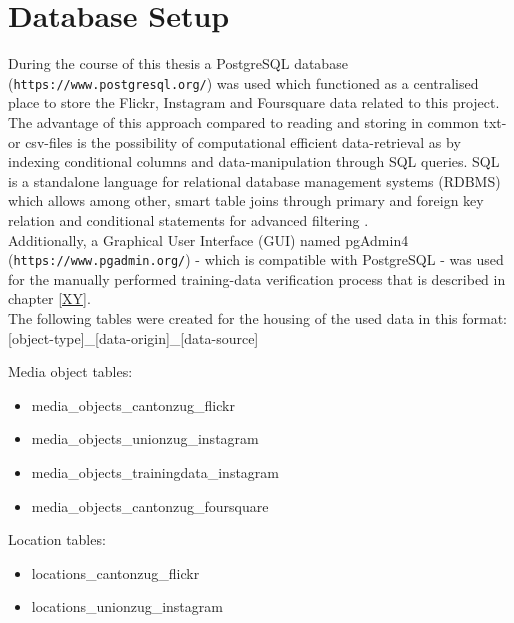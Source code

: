 \section{Database Setup} \label{database_setup}
During the course of this thesis a PostgreSQL database (\texttt{https://www.postgresql.org/}) was used which functioned as a centralised place to store the Flickr, Instagram and Foursquare data related to this project. The advantage of this approach compared to reading and storing in common txt- or csv-files is the possibility of computational efficient data-retrieval as by indexing conditional columns and data-manipulation through SQL queries. SQL is a standalone language for relational database management systems (RDBMS) which allows among other, smart table joins through primary and foreign key relation and conditional statements for advanced filtering \parencite{PostgreSQL2019}.\\
Additionally, a Graphical User Interface (GUI) named pgAdmin4 (\texttt{https://www.pgadmin.org/}) - which is compatible with PostgreSQL - was used for the manually performed training-data verification process that is described in chapter \ref{XY}.\\
The following tables were created for the housing of the used data in this format: [object-type]\_[data-origin]\_[data-source] \\
\newline

Media object tables:\\
\begin{itemize}
    \item media\_objects\_cantonzug\_flickr
    \item media\_objects\_unionzug\_instagram
    \item media\_objects\_trainingdata\_instagram
    \item media\_objects\_cantonzug\_foursquare
\end{itemize}

Location tables:\\
\begin{itemize}
    \item locations\_cantonzug\_flickr
    \item locations\_unionzug\_instagram
\end{itemize}

